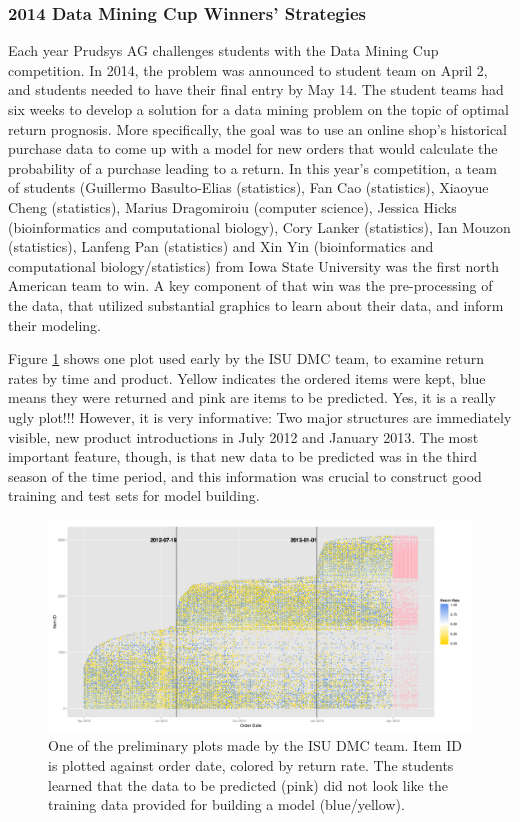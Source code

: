 \documentclass[11pt]{article}
\begin{document}
\subsubsection{2014 Data Mining Cup Winners' Strategies}

Each year Prudsys AG  challenges students with  the Data Mining Cup competition. In 2014, the problem was announced to student team on April 2, and students needed to have their final entry by May 14. The student teams had six weeks to develop a solution for a data mining problem on the topic of optimal return prognosis. More specifically, the goal was to use an online shop's historical purchase data to come up with a model for new orders that would calculate the probability of a purchase leading to a return. In this year's competition, a team of students (Guillermo Basulto-Elias (statistics), Fan Cao (statistics), Xiaoyue Cheng (statistics), Marius Dragomiroiu (computer science), Jessica Hicks (bioinformatics and computational biology), Cory Lanker (statistics), Ian Mouzon (statistics), Lanfeng Pan (statistics) and Xin Yin (bioinformatics and computational biology/statistics) from Iowa State University was the first north American team to win. A key component of that win was the pre-processing of the data, that utilized substantial graphics to learn about their data, and inform their modeling.

Figure \ref{DMC1} shows one plot used early by the ISU DMC team, to examine return rates by time and product. Yellow indicates the ordered items were kept, blue means they were returned and pink are items to be predicted. Yes, it is a really ugly plot!!! However, it is very informative: Two major structures are immediately visible, new product introductions in July 2012 and January 2013. The most important feature, though, is that new data to be predicted was in the third season of the time period, and this information was crucial to construct good training and test sets for model building.

\begin{figure}[htp]
\centerline{\includegraphics[width=7in]{images/orderDate_itemID.png}}
\caption{One of the preliminary plots made by the ISU DMC team. Item ID is plotted against order date, colored by return rate. The students learned that the data to be predicted (pink) did not look like the training data provided for building a model (blue/yellow).}
\label{DMC1}
\end{figure}
\end{document}
